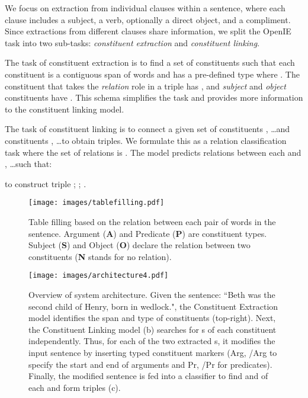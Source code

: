 \documentclass[11pt,a4paper]{article}
\begin{document}
We focus on extraction from individual clauses within a sentence, where each clause includes a subject, a verb, optionally a direct object, and a compliment. Since extractions from different clauses share information, we split the OpenIE task into two sub-tasks: {\it constituent extraction} and {\it constituent linking}.


The task of constituent extraction is to find a set of constituents such that each constituent  is a contiguous span of words  and has a pre-defined type  where . The constituent that takes the \emph{relation} role in a triple has , and \emph{subject} and \emph{object} constituents have .
This schema simplifies the task and provides more information to the constituent linking model.
 
The task of constituent linking is to connect a given set of  constituents , \dots  and  constituents , \dots  to obtain triples. We formulate this as a relation classification task where the set of relations is . The model predicts relations  between each  and , \dots  such that:
\vspace{-0.5em}

to construct triple ; ; .

\begin{figure}[ht!]
\texttt{[image: images/tablefilling.pdf]}
\caption{Table filling based on the relation between each pair of words in the sentence. Argument (\textbf{A}) and Predicate (\textbf{P}) are constituent types. Subject (\textbf{S}) and Object (\textbf{O}) declare the relation between two constituents (\textbf{N} stands for no relation).}
\label{fig:constitunet_table}
\vspace{-1em}
\end{figure}

\begin{figure*}[t]
\centering
\texttt{[image: images/architecture4.pdf]}
\caption{
Overview of system architecture. Given the sentence: ``Beth was the second child of Henry, born in wedlock.", the Constituent Extraction model identifies the span and type of constituents (top-right). Next, the Constituent Linking model (b) searches for s of each  constituent independently. Thus, for each of the two extracted s, it modifies the input sentence by inserting typed constituent markers (Arg, /Arg to specify the start and end of arguments and Pr, /Pr for predicates). Finally, the modified sentence is fed into a classifier to find  and  of each  and form triples (c).}
\label{fig:SystemArchitecture}
\vspace{-1em}
\end{figure*}
\end{document}
